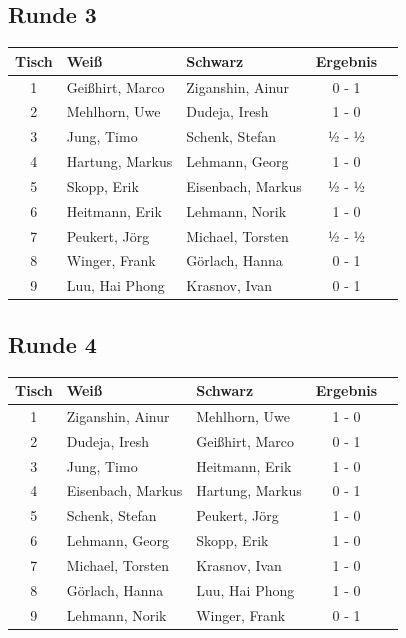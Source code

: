 \documentclass[a4paper,ngerman]{tui-algo-seminar}
\begin{document}
\subsection{Runde 3}
\begin{center}
\begin{tabular}{cllcl}
\toprule
\textbf{Tisch} & \textbf{Weiß} & \textbf{Schwarz} & \textbf{Ergebnis} \\
\midrule
1 & Geißhirt, Marco & Ziganshin, Ainur & 0 - 1 \\
2 & Mehlhorn, Uwe & Dudeja, Iresh & 1 - 0 \\
3 & Jung, Timo & Schenk, Stefan & ½ - ½ \\
4 & Hartung, Markus & Lehmann, Georg & 1 - 0 \\
5 & Skopp, Erik & Eisenbach, Markus & ½ - ½ \\
6 & Heitmann, Erik & Lehmann, Norik & 1 - 0 \\
7 & Peukert, Jörg & Michael, Torsten & ½ - ½ \\
8 & Winger, Frank & Görlach, Hanna & 0 - 1 \\
9 & Luu, Hai Phong & Krasnov, Ivan & 0 - 1 \\
\bottomrule
\end{tabular}
\end{center}

\subsection{Runde 4}
\begin{center}
\begin{tabular}{cllcl}
\toprule
\textbf{Tisch} & \textbf{Weiß} & \textbf{Schwarz} & \textbf{Ergebnis} \\
\midrule
1 & Ziganshin, Ainur & Mehlhorn, Uwe & 1 - 0 \\
2 & Dudeja, Iresh & Geißhirt, Marco & 0 - 1 \\
3 & Jung, Timo & Heitmann, Erik & 1 - 0 \\
4 & Eisenbach, Markus & Hartung, Markus & 0 - 1 \\
5 & Schenk, Stefan & Peukert, Jörg & 1 - 0 \\
6 & Lehmann, Georg & Skopp, Erik & 1 - 0 \\
7 & Michael, Torsten & Krasnov, Ivan & 1 - 0 \\
8 & Görlach, Hanna & Luu, Hai Phong & 1 - 0 \\
9 & Lehmann, Norik & Winger, Frank & 0 - 1 \\
\bottomrule
\end{tabular}
\end{center}
\clearpage
\end{document}
